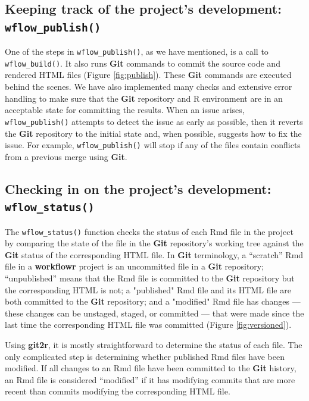 \documentclass[9pt,a4paper]{extarticle}
\begin{document}
\subsection*{Keeping track of the project's development: \texttt{wflow\_publish()}}

One of the steps in \texttt{wflow\_publish()}, as we have mentioned, is a call to
\texttt{wflow\_build()}. It also runs \textbf{Git} commands to commit the source code and
rendered HTML files (Figure \ref{fig:publish}). These \textbf{Git} commands are executed behind
the scenes. We have also implemented many checks and extensive error
handling to make sure that the \textbf{Git} repository and R environment are in
an acceptable state for committing the results. When an issue arises,
\texttt{wflow\_publish()} attempts to detect the issue as early as possible, then
it reverts the \textbf{Git} repository to the initial state and, when possible,
suggests how to fix the issue. For example, \texttt{wflow\_publish()} will stop if
any of the files contain conflicts from a previous merge using \textbf{Git}.

\subsection*{Checking in on the project's development: \texttt{wflow\_status()}}

The \texttt{wflow\_status()} function checks the status of each Rmd file in the
project by comparing the state of the file in the \textbf{Git} repository's
working tree against the \textbf{Git} status of the corresponding HTML file. In
 \textbf{Git} terminology, a “scratch” Rmd file in a \textbf{workflowr} project is an
uncommitted file in a \textbf{Git} repository; “unpublished” means that the Rmd
file is committed to the \textbf{Git} repository but the corresponding HTML is
not; a "published" Rmd file and its HTML file are both committed to the
 \textbf{Git} repository; and a "modified" Rmd file has changes --- these changes
can be unstaged, staged, or committed --- that were made since the last
time the corresponding HTML file was committed (Figure \ref{fig:versioned}).

Using \textbf{git2r}, it is mostly straightforward to determine the status of
each file. The only complicated step is determining whether published
Rmd files have been modified. If all changes to an Rmd file have been
committed to the \textbf{Git} history, an Rmd file is considered “modified” if it
has modifying commits that are more recent than commits modifying the
corresponding HTML file.
\end{document}
